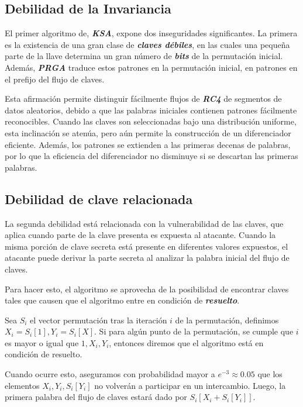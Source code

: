 \documentclass[
]{article}
\begin{document}
\hypertarget{debilidad-de-la-invariancia}{%
\subsection{Debilidad de la
Invariancia}\label{debilidad-de-la-invariancia}}

El primer algoritmo de, \textbf{\emph{KSA}}, expone dos inseguridades
significantes. La primera es la existencia de una gran clase de
\textbf{\emph{claves débiles}}, en las cuales una pequeña parte de la
llave determina un gran número de \textbf{\emph{bits}} de la permutación
inicial. Además, \textbf{\emph{PRGA}} traduce estos patrones en la
permutación inicial, en patrones en el prefijo del flujo de claves.

Esta afirmación permite distinguir fácilmente flujos de
\textbf{\emph{RC4}} de segmentos de datos aleatorios, debido a que las
palabras iniciales contienen patrones fácilmente reconocibles. Cuando
las claves son seleccionadas bajo una distribución uniforme, esta
inclinación se atenúa, pero aún permite la construcción de un
diferenciador eficiente. Además, los patrones se extienden a las
primeras decenas de palabras, por lo que la eficiencia del diferenciador
no disminuye si se descartan las primeras palabras.

\hypertarget{debilidad-de-clave-relacionada}{%
\subsection{Debilidad de clave
relacionada}\label{debilidad-de-clave-relacionada}}

La segunda debilidad está relacionada con la vulnerabilidad de las
claves, que aplica cuando parte de la clave presenta es expuesta al
atacante. Cuando la misma porción de clave secreta está presente en
diferentes valores expuestos, el atacante puede derivar la parte secreta
al analizar la palabra inicial del flujo de claves.

Para hacer esto, el algoritmo se aprovecha de la posibilidad de
encontrar claves tales que causen que el algoritmo entre en condición de
\textbf{\emph{resuelto}}.

Sea \(S_i\) el vector permutación tras la iteración \(i\) de la
permutación, definimos \(X_i = S_i[1], Y_i = S_i[X]\). Si para algún
punto de la permutación, se cumple que \(i\) es mayor o igual que
\(1, X_i, Y_i\), entonces diremos que el algoritmo está en condición de
resuelto.

Cuando ocurre esto, aseguramos con probabilidad mayor a
\(e^{-3} \approx 0.05\) que los elementos \(X_i, Y_i,S_i[Y_i]\) no
volverán a participar en un intercambio. Luego, la primera palabra del
flujo de claves estará dado por \(S_i[X_i + S_i[Y_i]]\).
\end{document}
